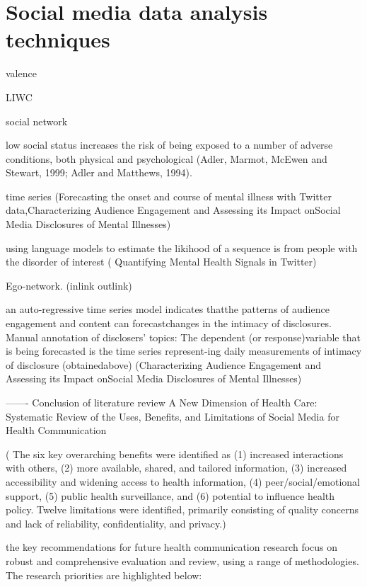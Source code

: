 \section{Social media data analysis techniques}

valence

LIWC

social network

low social status increases the risk of being exposed to a number of adverse conditions, both physical and psychological (Adler, Marmot, McEwen and Stewart, 1999; Adler and Matthews, 1994). 

time series (Forecasting the onset and course of mental illness with Twitter data,Characterizing Audience Engagement and Assessing its Impact onSocial Media Disclosures of Mental Illnesses)

 using language models to estimate the likihood of a sequence is from people with the disorder of interest ( Quantifying Mental Health Signals in Twitter)

 Ego-network. (inlink outlink)

 an auto-regressive time series model indicates thatthe patterns of audience engagement and content can forecastchanges in the intimacy of disclosures. 
Manual annotation of disclosers’ topics:
The dependent (or response)variable that is being forecasted is the time series represent-ing daily measurements of intimacy of disclosure (obtainedabove) (Characterizing Audience Engagement and Assessing its Impact onSocial Media Disclosures of Mental Illnesses)




-------
Conclusion of literature review 
A New Dimension of Health Care: Systematic Review of the Uses, Benefits, and Limitations of Social Media for Health Communication

( The six key overarching benefits were identified as (1) increased interactions with others, (2) more available, shared, and tailored information, (3) increased accessibility and widening access to health information, (4) peer/social/emotional support, (5) public health surveillance, and (6) potential to influence health policy. Twelve limitations were identified, primarily consisting of quality concerns and lack of reliability, confidentiality, and privacy.)


 the key recommendations for future health communication research focus on robust and comprehensive evaluation and review, using a range of methodologies. The research priorities are highlighted below:

